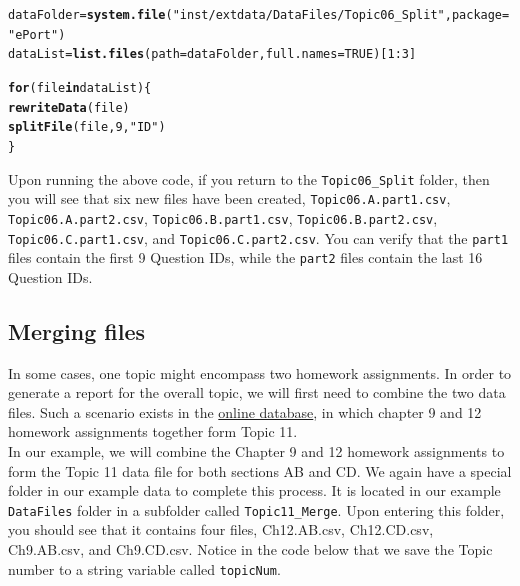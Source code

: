 \documentclass{article}\usepackage[]{graphicx}\usepackage[]{color}
\makeatletter
\newcommand{\hlnum}[1]{\textcolor[rgb]{0.686,0.059,0.569}{#1}}%
\newcommand{\hlstr}[1]{\textcolor[rgb]{0.192,0.494,0.8}{#1}}%
\newcommand{\hlopt}[1]{\textcolor[rgb]{0,0,0}{#1}}%
\newcommand{\hlstd}[1]{\textcolor[rgb]{0.345,0.345,0.345}{#1}}%
\newcommand{\hlkwa}[1]{\textcolor[rgb]{0.161,0.373,0.58}{\textbf{#1}}}%
\newcommand{\hlkwb}[1]{\textcolor[rgb]{0.69,0.353,0.396}{#1}}%
\newcommand{\hlkwc}[1]{\textcolor[rgb]{0.333,0.667,0.333}{#1}}%
\newcommand{\hlkwd}[1]{\textcolor[rgb]{0.737,0.353,0.396}{\textbf{#1}}}%
\newenvironment{kframe}{%
 \def\at@end@of@kframe{}%
 \ifinner\ifhmode%
  \def\at@end@of@kframe{\end{minipage}}%
  \begin{minipage}{\columnwidth}%
 \fi\fi%
 \def\FrameCommand##1{\hskip\@totalleftmargin \hskip-\fboxsep
 \colorbox{shadecolor}{##1}\hskip-\fboxsep
     \hskip-\linewidth \hskip-\@totalleftmargin \hskip\columnwidth}%
 \MakeFramed {\advance\hsize-\width
   \@totalleftmargin\z@ \linewidth\hsize
   \@setminipage}}%
 {\par\unskip\endMakeFramed%
 \at@end@of@kframe}
\newenvironment{knitrout}{}{} %
\numberwithin{equation}{section} %
\makeatother
\begin{document}
\begin{knitrout}
\color{fgcolor}\begin{kframe}
\begin{alltt}
\hlstd{dataFolder} \hlkwb{=} \hlkwd{system.file}\hlstd{(}\hlstr{"inst/extdata/DataFiles/Topic06_Split"}\hlstd{,} \hlkwc{package} \hlstd{=} \hlstr{"ePort"}\hlstd{)}
\hlstd{dataList} \hlkwb{=} \hlkwd{list.files}\hlstd{(}\hlkwc{path} \hlstd{= dataFolder,} \hlkwc{full.names} \hlstd{=} \hlnum{TRUE}\hlstd{)[}\hlnum{1}\hlopt{:}\hlnum{3}\hlstd{]}

\hlkwa{for}\hlstd{(file} \hlkwa{in} \hlstd{dataList)\{}
  \hlkwd{rewriteData}\hlstd{(file)}
  \hlkwd{splitFile}\hlstd{(file,} \hlnum{9}\hlstd{,} \hlstr{"ID"}\hlstd{)}
\hlstd{\}}
\end{alltt}
\end{kframe}
\end{knitrout}

Upon running the above code, if you return to the \texttt{Topic06\_Split} folder, then you will see that six new files have been created, \texttt{Topic06.A.part1.csv}, \texttt{Topic06.A.part2.csv}, \texttt{Topic06.B.part1.csv}, \texttt{Topic06.B.part2.csv}, \texttt{Topic06.C.part1.csv}, and \texttt{Topic06.C.part2.csv}. You can verify that the \texttt{part1} files contain the first 9 Question IDs, while the \texttt{part2} files contain the last 16 Question IDs.

\subsection{Merging files}

In some cases, one topic might encompass two homework assignments. In order to generate a report for the overall topic, we will first need to combine the two data files. Such a scenario exists in the \hyperref[sec:OnlineHomework]{online database}, in which chapter 9 and 12 homework assignments together form Topic 11. \\

In our example, we will combine the Chapter 9 and 12 homework assignments to form the Topic 11 data file for both sections AB and CD. We again have a special folder in our example data to complete this process. It is located in our example \texttt{DataFiles} folder in a subfolder called \texttt{Topic11\_Merge}. Upon entering this folder, you should see that it contains four files, Ch12.AB.csv, Ch12.CD.csv, Ch9.AB.csv, and Ch9.CD.csv. Notice in the code below that we save the Topic number to a string variable called \texttt{topicNum}. \\
\end{document}
